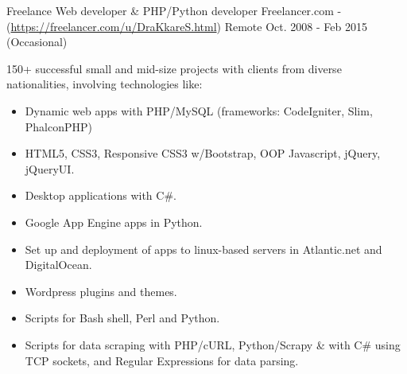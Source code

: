 \begin{cventries}
\cventry
{Freelance Web developer \& PHP/Python developer} %
{Freelancer.com - (\href{https://freelancer.com/u/DraKkareS.html}{https://freelancer.com/u/DraKkareS.html})} %
{Remote} %
{Oct. 2008 - Feb 2015 (Occasional)} %
{ %
	\begin{cvitems}
		\item {150+ successful small and mid-size projects with clients from diverse nationalities, involving technologies like:
		\begin{itemize}
			\item {Dynamic web apps with PHP/MySQL (frameworks: CodeIgniter, Slim, PhalconPHP)}
			\item {HTML5, CSS3, Responsive CSS3 w/Bootstrap, OOP Javascript, jQuery, jQueryUI.}
			\item {Desktop applications with C\#.}
			\item {Google App Engine apps in Python.}
			\item {Set up and deployment of apps to linux-based servers in Atlantic.net and DigitalOcean.}
			\item {Wordpress plugins and themes.}
			\item {Scripts for Bash shell, Perl and Python.}
			\item {Scripts for data scraping with PHP/cURL, Python/Scrapy \& with C\# using TCP sockets, and Regular Expressions for data parsing.}
		\end{itemize}	
	}	
	\end{cvitems}
}


\end{cventries}